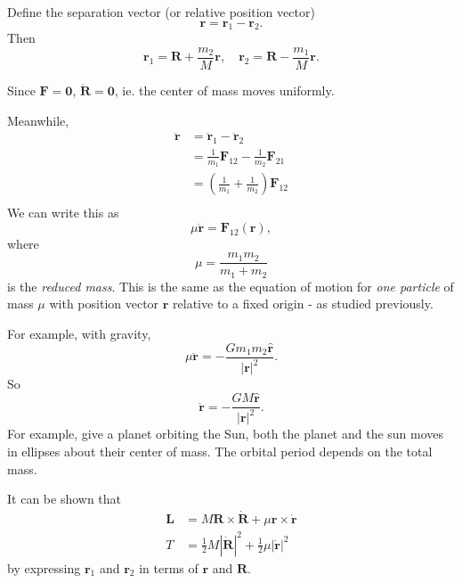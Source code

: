 \documentclass[a4paper]{article}
\begin{document}
Define the separation vector (or relative position vector)
\[
  \mathbf{r} = \mathbf{r}_1 - \mathbf{r}_2.
\]
Then
\[
  \mathbf{r}_1 = \mathbf{R} + \frac{m_2}{M}\mathbf{r},\quad \mathbf{r}_2 = \mathbf{R} - \frac{m_1}{M}\mathbf{r}.
\]
\begin{center}
\end{center}

Since $\mathbf{F} = \mathbf{0}$, $\ddot{\mathbf{R}} = \mathbf{0}$, ie. the center of mass moves uniformly.

Meanwhile,
\begin{align*}
  \ddot{\mathbf{r}} &= \ddot{\mathbf{r}}_1 - \ddot{\mathbf{r}}_2\\
  &= \frac{1}{m_1} \mathbf{F}_{12} - \frac{1}{m_2}\mathbf{F}_{21}\\
  &= \left(\frac{1}{m_1} + \frac{1}{m_2}\right) \mathbf{F}_{12}\\
\end{align*}
We can write this as
\[
  \mu \ddot{\mathbf{r}} = \mathbf{F}_{12}(\mathbf{r}),
\]
where
\[
  \mu = \frac{m_1m_2}{m_1 + m_2}
\]
is the \emph{reduced mass}. This is the same as the equation of motion for \emph{one particle} of mass $\mu$ with position vector $\mathbf{r}$ relative to a fixed origin - as studied previously.

For example, with gravity,
\[
  \mu \ddot{\mathbf{r}} = -\frac{Gm_1m_2 \hat{\mathbf{r}}}{|\mathbf{r}|^2}.
\]
So
\[
  \ddot{\mathbf{r}} = -\frac{GM\hat{\mathbf{r}}}{|\mathbf{r}|^2}.
\]
For example, give a planet orbiting the Sun, both the planet and the sun moves in ellipses about their center of mass. The orbital period depends on the total mass.

It can be shown that
\begin{align*}
  \mathbf{L} &= M\mathbf{R} \times \dot{\mathbf{R}} + \mu \mathbf{r}\times \dot{\mathbf{r}}\\
  T &= \frac{1}{2} M|\dot{\mathbf{R}}|^2 + \frac{1}{2}\mu |\dot{\mathbf{r}}|^2
\end{align*}
by expressing $\mathbf{r}_1$ and $\mathbf{r}_2$ in terms of $\mathbf{r}$ and $\mathbf{R}$.
\end{document}
